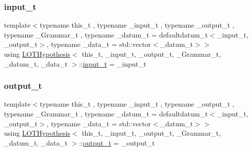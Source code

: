 \subsubsection{\texorpdfstring{input\+\_\+t}{input\_t}}
{\footnotesize\ttfamily template$<$typename this\+\_\+t , typename \+\_\+input\+\_\+t , typename \+\_\+output\+\_\+t , typename \+\_\+\+Grammar\+\_\+t , typename \+\_\+datum\+\_\+t  = defaultdatum\+\_\+t$<$\+\_\+input\+\_\+t, \+\_\+output\+\_\+t$>$, typename \+\_\+data\+\_\+t  = std\+::vector$<$\+\_\+datum\+\_\+t$>$$>$ \\
using \hyperlink{class_l_o_t_hypothesis}{L\+O\+T\+Hypothesis}$<$ this\+\_\+t, \+\_\+input\+\_\+t, \+\_\+output\+\_\+t, \+\_\+\+Grammar\+\_\+t, \+\_\+datum\+\_\+t, \+\_\+data\+\_\+t $>$\+::\hyperlink{class_l_o_t_hypothesis_aeb5adc395a32008d9fe1b5fb7ba75e95}{input\+\_\+t} =  \+\_\+input\+\_\+t}

\mbox{\label{class_l_o_t_hypothesis_ae524caf92d167011278706b6af8bf0bb}} 
\subsubsection{\texorpdfstring{output\+\_\+t}{output\_t}}
{\footnotesize\ttfamily template$<$typename this\+\_\+t , typename \+\_\+input\+\_\+t , typename \+\_\+output\+\_\+t , typename \+\_\+\+Grammar\+\_\+t , typename \+\_\+datum\+\_\+t  = defaultdatum\+\_\+t$<$\+\_\+input\+\_\+t, \+\_\+output\+\_\+t$>$, typename \+\_\+data\+\_\+t  = std\+::vector$<$\+\_\+datum\+\_\+t$>$$>$ \\
using \hyperlink{class_l_o_t_hypothesis}{L\+O\+T\+Hypothesis}$<$ this\+\_\+t, \+\_\+input\+\_\+t, \+\_\+output\+\_\+t, \+\_\+\+Grammar\+\_\+t, \+\_\+datum\+\_\+t, \+\_\+data\+\_\+t $>$\+::\hyperlink{class_l_o_t_hypothesis_ae524caf92d167011278706b6af8bf0bb}{output\+\_\+t} =  \+\_\+output\+\_\+t}

\mbox{\label{class_l_o_t_hypothesis_a9121619ee7a99c2c5a177e38e3e098fc}} 
